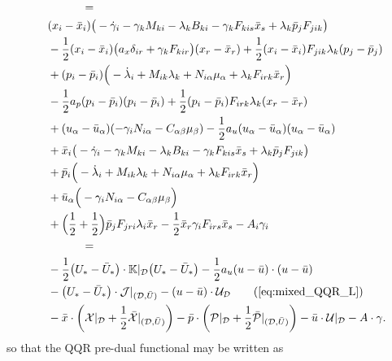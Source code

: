 \documentclass[11pt]{article}
\begin{document}
\begin{subequations}
\begin{align}
    & \qquad \qquad = \notag \\
    & \quad (x_i - \bar{x}_i) \big( - \dot{\gamma}_i - \gamma_k M_{ki} - \lambda_k B_{ki} - \gamma_k F_{kis} \bar{x}_s + \lambda_k \bar{p}_j F_{jik} \big) \notag \\
      & \quad - \half (x_i - \bar{x}_i) \big( a_x \delta_{ir} + \gamma_k F_{kir} \big) (x_r - \bar{x}_r) + \half (x_i - \bar{x}_i) F_{jik} \lambda_k (p_j - \bar{p}_j) \notag \\
      & \quad  + (p_i - \bar{p}_i) \Big( - \dot{\lambda}_i + M_{ik} \lambda_k + N_{i \alpha} \mu_\alpha + \lambda_k F_{irk} \bar{x}_r \Big) \notag \\
      & \quad  - \half a_p (p_i - \bar{p}_i) (p_i - \bar{p}_i) + \half (p_ i - \bar{p}_i) F_{irk} \lambda_k (x_r - \bar{x}_r) \notag\\
      & \quad  + (u_\alpha - \bar{u}_\alpha) (- \gamma_i N_{i \alpha} - C_{\alpha \beta} \mu_\beta ) - \half a_u (u_\alpha - \bar{u}_\alpha) (u_\alpha - \bar{u}_\alpha) \notag\\
      & \quad  + \bar{x}_i \big( - \dot{\gamma}_i - \gamma_k M_{ki} - \lambda_k B_{ki} - \gamma_k F_{kis} \bar{x}_s + \lambda_k \bar{p}_j F_{jik} \big) \notag \\
      & \quad  + \bar{p}_i \Big( - \dot{\lambda}_i + M_{ik} \lambda_k + N_{i \alpha} \mu_\alpha + \lambda_k F_{irk} \bar{x}_r \Big) \notag \\
      & \quad + \bar{u}_\alpha \Big( - \gamma_i N_{i \alpha} - C_{\alpha \beta} \mu_\beta \Big) \notag\\
      & \quad  + \Big( \half + \half \Big) \bar{p}_j F_{jri}\lambda_i  \bar{x}_r - \half \bar{x}_r \gamma_i F_{irs} \bar{x}_s - A_i \gamma_i  \notag \\ 
      & \qquad \qquad = \notag \\
      & \quad - \half \big( U_* - \bar{U}_* \big) \cdot \K|_\dee \big( U_* - \bar{U}_* \big) - \half a_u (u - \bar{u})\cdot (u - \bar{u}) \notag\\
      & \quad - \big( U_* - \bar{U}_* \big) \cdot \mathcal{J}|_{(\dee,\bar{U})} - (u - \bar{u}) \cdot \mathcal{U}_\dee \tag{\ref{eq:mixed_QQR_L}}\\
      & \quad - \bar{x} \cdot \left( \calX |_\dee + \half \bar{\calX}|_{(\dee, \bar{U})} \right) - \bar{p} \cdot \left( \calP |_\dee + \half \bar{\calP}|_{(\dee, \bar{U})} \right) - \bar{u} \cdot \calU |_\dee - A \cdot \gamma.\notag
\end{align}
\end{subequations}
 so that the QQR pre-dual functional may be written as
\end{document}
